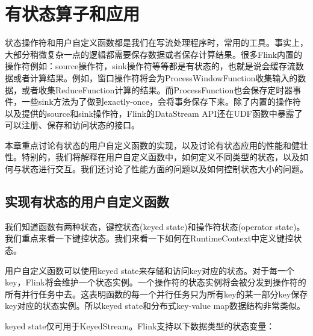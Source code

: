 \documentclass[cn,11pt,chinese]{elegantbook}
\begin{document}
\hypertarget{ux6709ux72b6ux6001ux7b97ux5b50ux548cux5e94ux7528}{%
\chapter{有状态算子和应用}\label{ux6709ux72b6ux6001ux7b97ux5b50ux548cux5e94ux7528}}

状态操作符和用户自定义函数都是我们在写流处理程序时，常用的工具。事实上，大部分稍微复杂一点的逻辑都需要保存数据或者保存计算结果。很多Flink内置的操作符例如：source操作符，sink操作符等等都是有状态的，也就是说会缓存流数据或者计算结果。例如，窗口操作符将会为ProcessWindowFunction收集输入的数据，或者收集ReduceFunction计算的结果。而ProcessFunction也会保存定时器事件，一些sink方法为了做到exactly-once，会将事务保存下来。除了内置的操作符以及提供的source和sink操作符，Flink的DataStream
API还在UDF函数中暴露了可以注册、保存和访问状态的接口。

本章重点讨论有状态的用户自定义函数的实现，以及讨论有状态应用的性能和健壮性。特别的，我们将解释在用户自定义函数中，如何定义不同类型的状态，以及如何与状态进行交互。我们还讨论了性能方面的问题以及如何控制状态大小的问题。

\hypertarget{ux5b9eux73b0ux6709ux72b6ux6001ux7684ux7528ux6237ux81eaux5b9aux4e49ux51fdux6570}{%
\section{实现有状态的用户自定义函数}\label{ux5b9eux73b0ux6709ux72b6ux6001ux7684ux7528ux6237ux81eaux5b9aux4e49ux51fdux6570}}

我们知道函数有两种状态，键控状态(keyed state)和操作符状态(operator
state)。我们重点来看一下键控状态。我们来看一下如何在RuntimeContext中定义键控状态。

用户自定义函数可以使用keyed
state来存储和访问key对应的状态。对于每一个key，Flink将会维护一个状态实例。一个操作符的状态实例将会被分发到操作符的所有并行任务中去。这表明函数的每一个并行任务只为所有key的某一部分key保存key对应的状态实例。所以keyed
state和分布式key-value map数据结构非常类似。

keyed state仅可用于KeyedStream。Flink支持以下数据类型的状态变量：
\end{document}

